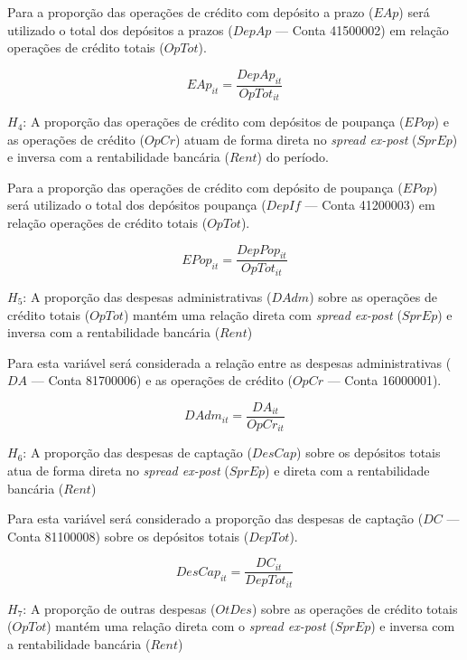 \documentclass[
  12pt,
  12pt,
  openright,
  oneside,
  a4paper,
  chapter=TITLE,
  section=TITLE,
  subsection=TITLE,
  subsubsection=TITLE,
  english,
  portugues,
  sumario=tradicional]{abntex2}
\begin{document}
Para a proporção das operações de crédito com depósito a prazo (\(EAp\)) será utilizado o total dos depósitos a prazos (\(DepAp\) --- Conta 41500002) em relação operações de crédito totais (\(OpTot\)).

\begin{equation}
EAp_{it} = \frac{DepAp_{it}}{OpTot_{it}}
\end{equation}

\(H_{4}\): A proporção das operações de crédito com depósitos de poupança (\(EPop\)) e as operações de crédito (\(OpCr\)) atuam de forma direta no \emph{spread ex-post} (\(SprEp\)) e inversa com a rentabilidade bancária (\(Rent\)) do período.

Para a proporção das operações de crédito com depósito de poupança (\(EPop\)) será utilizado o total dos depósitos poupança (\(DepIf\) --- Conta 41200003) em relação operações de crédito totais (\(OpTot\)).

\begin{equation}
EPop_{it} = \frac{DepPop_{it}}{OpTot_{it}}
\end{equation}

\(H_{5}\): A proporção das despesas administrativas (\(DAdm\)) sobre as operações de crédito totais (\(OpTot\)) mantém uma relação direta com \emph{spread ex-post} (\(SprEp\)) e inversa com a rentabilidade bancária (\(Rent\))

Para esta variável será considerada a relação entre as despesas administrativas (\(DA\) --- Conta 81700006) e as operações de crédito (\(OpCr\) --- Conta 16000001).

\begin{equation}
DAdm_{it} = \frac{DA_{it}}{OpCr_{it}}
\end{equation}

\(H_{6}\): A proporção das despesas de captação (\(DesCap\)) sobre os depósitos totais atua de forma direta no \emph{spread ex-post} (\(SprEp\)) e direta com a rentabilidade bancária (\(Rent\))

Para esta variável será considerado a proporção das despesas de captação (\(DC\) --- Conta 81100008) sobre os depósitos totais (\(DepTot\)).

\begin{equation}
DesCap_{it} = \frac{DC_{it}}{DepTot_{it}}
\end{equation}

\(H_{7}\): A proporção de outras despesas (\(OtDes\)) sobre as operações de crédito totais (\(OpTot\)) mantém uma relação direta com o \emph{spread ex-post} (\(SprEp\)) e inversa com a rentabilidade bancária (\(Rent\))
\end{document}
